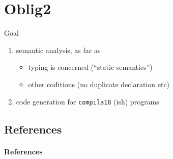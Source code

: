 \documentclass{beamer}
\begin{document}
\chapter{Oblig2}
\label{sec:org9eb6ae6}


\begin{frame}[fragile,label={sec:org01d2262}]{Goal}
 \begin{enumerate}
\item \alert{semantic  analysis}, as far as 
\begin{itemize}
\item \alert{typing} is concerned (``static semantics'')
\item other coditions (no duplicate declaration etc)
\end{itemize}

\item \alert{code generation} for \texttt{compila18} (ish) programs
\end{enumerate}
\end{frame}



\section{References}
\label{sec:org884b755}

\begin{frame}[allowframebreaks]
  \frametitle{References}
  {\tiny
    
%     
  }
\end{frame}




\end{document}
